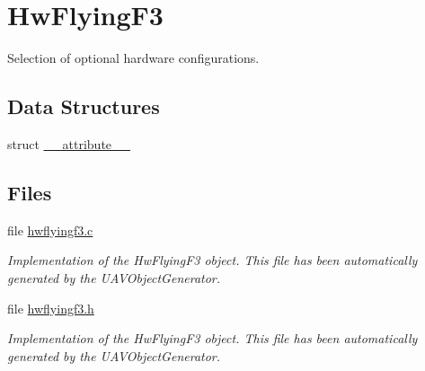 \hypertarget{group___hw_flying_f3}{\section{\-Hw\-Flying\-F3}
\label{group___hw_flying_f3}
}


\-Selection of optional hardware configurations.  


\subsection*{\-Data \-Structures}
\begin{DoxyCompactItemize}
\item 
struct \hyperlink{struct____attribute____}{\-\_\-\-\_\-attribute\-\_\-\-\_\-}
\end{DoxyCompactItemize}
\subsection*{\-Files}
\begin{DoxyCompactItemize}
\item 
file \hyperlink{hwflyingf3_8c}{hwflyingf3.\-c}
\begin{DoxyCompactList}\small\item\em \-Implementation of the \-Hw\-Flying\-F3 object. \-This file has been automatically generated by the \-U\-A\-V\-Object\-Generator. \end{DoxyCompactList}\item 
file \hyperlink{hwflyingf3_8h}{hwflyingf3.\-h}
\begin{DoxyCompactList}\small\item\em \-Implementation of the \-Hw\-Flying\-F3 object. \-This file has been automatically generated by the \-U\-A\-V\-Object\-Generator. \end{DoxyCompactList}\end{DoxyCompactItemize}
